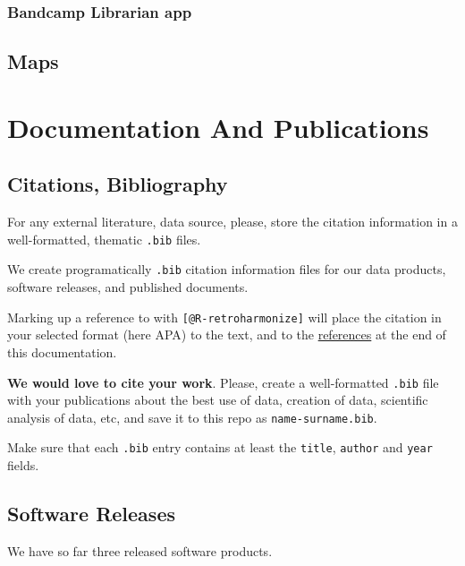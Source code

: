 \documentclass[
  fontsize=13pt,
  english,
  a4paper,
  openany, a4paper, oneside]{book}
\begin{document}
\hypertarget{bandcamp-librarian}{%
\subsection{Bandcamp Librarian app}\label{bandcamp-librarian}}

\hypertarget{maps}{%
\section{Maps}\label{maps}}

\hypertarget{documentation}{%
\chapter{Documentation And Publications}\label{documentation}}

\hypertarget{bibliography}{%
\section{Citations, Bibliography}\label{bibliography}}

For any external literature, data source, please, store the citation information in a well-formatted, thematic \texttt{.bib} files.

We create programatically \texttt{.bib} citation information files for our data products, software releases, and published documents.

Marking up a reference to \citep{R-retroharmonize} with \texttt{{[}@R-retroharmonize{]}} will place the citation in your selected format (here APA) to the text, and to the \protect\hyperlink{references}{references} at the end of this documentation.

\textbf{We would love to cite your work}. Please, create a well-formatted \texttt{.bib} file with your publications about the best use of data, creation of data, scientific analysis of data, etc, and save it to this repo as \texttt{name-surname.bib}.

Make sure that each \texttt{.bib} entry contains at least the \texttt{title}, \texttt{author} and \texttt{year} fields.

\hypertarget{software-releases}{%
\section{Software Releases}\label{software-releases}}

We have so far three released software products.
\end{document}
